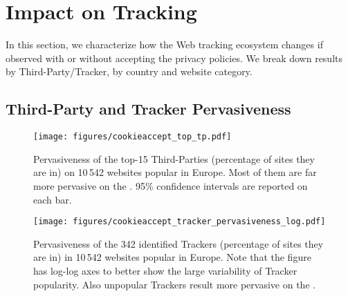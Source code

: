 \section{Impact on Tracking}
\label{sec:tracking}

In this section, we characterize how the Web tracking ecosystem changes if observed with or without accepting the privacy policies. We break down results by Third-Party/Tracker, by country and website category. %


\subsection{Third-Party and Tracker Pervasiveness}

\begin{figure}
    \centering
    \texttt{[image: figures/cookieaccept\_top\_tp.pdf]}
    \caption{Pervasiveness of the top-15 Third-Parties (percentage of sites they are in) on 10\,542 websites popular in Europe. Most of them are far more pervasive on the \AFTER. 95\% confidence intervals are reported on each bar. }
    \label{fig:ca_prevasiveness_top}
\end{figure}

\begin{figure}
    \centering
    \texttt{[image: figures/cookieaccept\_tracker\_pervasiveness\_log.pdf]}
    \caption{Pervasiveness of the 342 identified Trackers (percentage of sites they are in) in 10\,542 websites popular in Europe. Note that the figure has log-log axes to better show the large variability of Tracker popularity. Also unpopular Trackers result more pervasive on the \AFTER.}
    \label{fig:ca_prevasiveness_all}

\end{figure}

